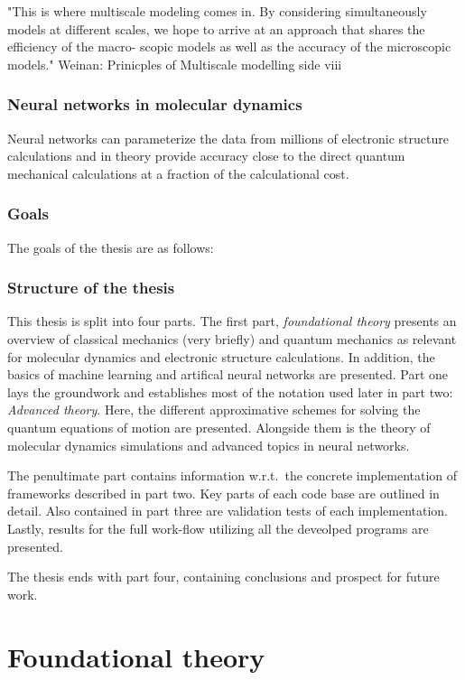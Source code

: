 \documentclass[twoside,english]{uiofysmaster}
\begin{document}
"This is where multiscale modeling comes in. By considering simultaneously models at different scales, we hope to arrive at an approach that shares the efficiency of the macro- scopic models as well as the accuracy of the microscopic models." Weinan: Prinicples of Multiscale modelling side viii

\section{Neural networks in molecular dynamics}
Neural networks can parameterize the data from millions of electronic structure calculations and in theory provide accuracy close to the direct quantum mechanical calculations at a fraction of the calculational cost.

\section{Goals}
The goals of the thesis are as follows:


\section{Structure of the thesis}
This thesis is split into four parts. The first part, \emph{foundational theory} presents an overview of classical mechanics (very briefly) and quantum mechanics as relevant for molecular dynamics and electronic structure calculations. In addition, the basics of machine learning and artifical neural networks are presented. Part one lays the groundwork and establishes most of the notation used later in part two: \emph{Advanced theory}. Here, the different approximative schemes for solving the quantum equations of motion are presented. Alongside them is the theory of molecular dynamics simulations and advanced topics in neural networks.

The penultimate part contains information w.r.t.\ the concrete implementation of frameworks described in part two. Key parts of each code base are outlined in detail. Also contained in part three are validation tests of each implementation. Lastly, results for the full work-flow utilizing all the deveolped programs are presented.

The thesis ends with part four, containing conclusions and prospect for future work.


\part{Foundational theory}
\end{document}
